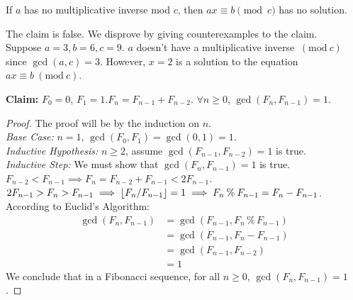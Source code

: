 \documentclass[11pt]{article}
\newcommand{\Mod}[1]{\ (\mathrm{mod}\ #1)}
\renewcommand*{\bmod}{\mathbin{\%}}
\begin{document}
\begin{Parts}
    \Part If $a$ has no multiplicative inverse mod $c$, then $ax \equiv b \pmod{c}$ has no solution.
    \begin{Answer}
        The claim is false. We disprove by giving counterexamples to the claim. \\
        Suppose $a=3,b=6,c=9$. $a$ doesn't have a multiplicative inverse $\Mod{c}$ since $\gcd(a,c)=3$. 
        However, $x=2$ is a solution to the equation $ax\equiv b \Mod{c}$. 
    \end{Answer}
\end{Parts}

\newpage
{}

\begin{Answer}
    \textbf{Claim:} $F_0=0$, $F_1=1$.$F_n=F_{n-1}+F_{n-2}$. $\forall n\geq 0$, $\gcd(F_n,F_{n-1})=1$.
    \begin{proof}
        The proof will be by the induction on $n$. \\
        \emph{Base Case:} $n=1$, $\gcd(F_0,F_1)=\gcd(0,1)=1$. \\
        \emph{Inductive Hypothesis:} $n\geq 2$, assume $\gcd(F_{n-1},F_{n-2})=1$ is true. \\
        \emph{Inductive Step:} We must show that $\gcd(F_n,F_{n-1})=1$ is true. \\ 
        $F_{n-2}<F_{n-1} \implies F_n=F_{n-2}+F_{n-1}<2F_{n-1}$. \\
        $2F_{n-1}>F_n>F_{n-1} \implies \floor{F_n/F_{n-1}}=1 \implies F_n\bmod F_{n-1}=F_n-F_{n-1}$. \\
        According to Euclid's Algorithm: 
        \begin{align*}
            \gcd(F_n,F_{n-1}) &= \gcd(F_{n-1},F_n\bmod F_{n-1}) \\
                              &= \gcd(F_{n-1},F_n-F_{n-1}) \\
                              &= \gcd(F_{n-1},F_{n-2}) \\
                              &= 1
        \end{align*}
        We conclude that in a Fibonacci sequence, for all $n \geq 0$, $\gcd(F_n, F_{n-1})=1$.
    \end{proof}
\end{Answer}
\end{document}

